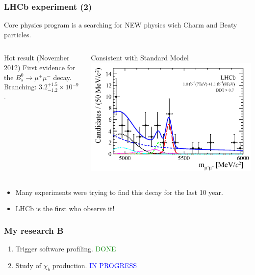 \documentclass{beamer}
\begin{document}
\begin{frame}
\frametitle{LHCb experiment (2)}
Core physics program is a searching for NEW physics wich Charm and Beaty particles.
\begin{columns}[c]
\begin{alertblock}{Hot result (November 2012)}
First evidence for the $B^{0}_{s} \rightarrow \mu^+ \mu^-$ decay.
Branching:  $3.2^{+1.5}_{-1.2} \times 10^{-9}$.
\end{alertblock}
Consistent with Standard Model
\includegraphics[width=\textwidth]{images/bs.png}
\end{columns}
\begin{itemize}
 \item Many experiments were trying to find this decay for the last 10 year.
 \item LHCb is the first who observe it!
\end{itemize}
\end{frame}
\begin{frame}
\frametitle{My research B}
\begin{enumerate}
    \item Trigger software profiling. \textcolor{green}{DONE}
    \item Study of $\chi_{b}$ production. \textcolor{blue}{IN PROGRESS}
\end{enumerate}
\end{frame}
\end{document}
